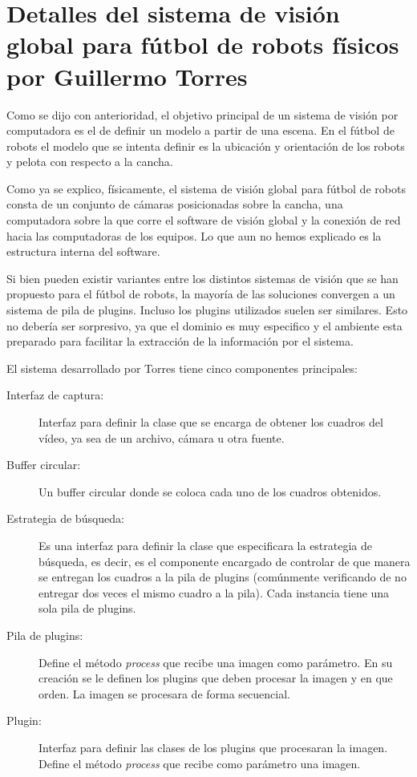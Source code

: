 
\section{Detalles del sistema de visión global para fútbol de robots físicos por
Guillermo Torres}

Como se dijo con anterioridad, el objetivo principal de un sistema de visión por
computadora es el de definir un modelo a partir de una escena. En el fútbol de
robots el modelo que se intenta definir es la ubicación y orientación de los
robots y pelota con respecto a la cancha.

Como ya se explico, físicamente, el sistema de visión global para fútbol de
robots consta de un conjunto de cámaras posicionadas sobre la cancha, una
computadora sobre la que corre el software de visión global y la conexión de red
hacia las computadoras de los equipos. Lo que aun no hemos explicado es la
estructura interna del software.

Si bien pueden existir variantes entre los distintos sistemas de visión que se
han propuesto para el fútbol de robots, la mayoría de las soluciones convergen a
un sistema de pila de plugins. Incluso los plugins utilizados
suelen ser similares. Esto no debería ser sorpresivo, ya que el dominio es muy
especifico y el ambiente esta preparado para facilitar la extracción de la
información por el sistema.

El sistema desarrollado por Torres tiene cinco componentes principales:

\begin{description}

\item[Interfaz de captura:] Interfaz para definir la clase que se encarga de
	obtener los cuadros del vídeo, ya sea de un archivo, cámara u otra
	fuente.

\item[Buffer circular:] Un buffer circular donde se coloca cada uno de los
	cuadros obtenidos.

\item[Estrategia de búsqueda:] Es una interfaz para definir la clase que
	especificara la estrategia de búsqueda, es decir, es el componente
	encargado de controlar de que manera se entregan los cuadros a la pila
	de plugins (comúnmente verificando de no entregar dos veces el
	mismo cuadro a la pila). Cada instancia tiene una sola pila de
	plugins.
	
\item[Pila de plugins:] Define el método \emph{process} que recibe una imagen
	como parámetro. En su creación se le definen los plugins que
	deben procesar la imagen y en que orden. La imagen se procesara de forma
	secuencial.

\item[Plugin:] Interfaz para definir las clases de los plugins que
	procesaran la imagen. Define el método \emph{process} que recibe como
	parámetro una imagen.

\end{description}


